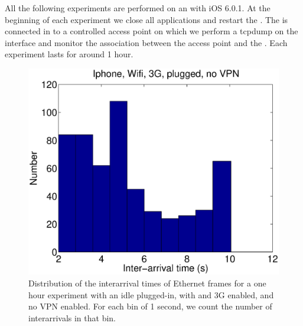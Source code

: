All the following experiments are performed on an  with iOS
6.0.1.  At the beginning of each experiment we close all applications
and restart the \iphone{}. The \iphone{} is connected in \wifi{} to a
controlled access point on which we perform a tcpdump on the \wifi{}
interface and monitor the \wifi{} association between the access point
and the \iphone{}. Each experiment lasts for around 1 hour. 

\begin{figure}
\centering
        \includegraphics[width=0.8\linewidth]{../../code/pushNotification/Fig/bw_iphone_wifi_3g_plug_novpn_interTs.eps}
  \caption{Distribution of the interarrival times of Ethernet frames
    for a one hour experiment with an idle \iphone{} plugged-in, with \wifi{} and 3G
    enabled, and no VPN enabled. For each bin of 1 second, we count
    the number of interarrivals in that bin.}
  \label{fig:push_w3p_interTs}
\end{figure}


